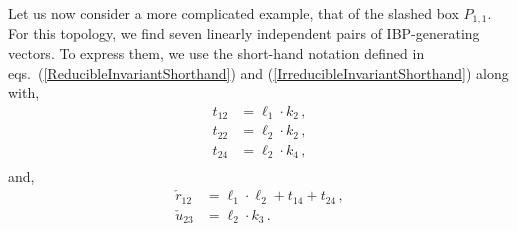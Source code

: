 \documentclass[aps,prd,preprint,groupedaddress,nofootinbib,showpacs,eqsecnum]{revtex4}
\def\eqns#1#2{eqs.~(\ref{#1}) and (\ref{#2})}
\def\Pn#1#2{P_{#1,#2}}
\begin{document}
\def\rs{\check{r}}
\def\us{\check{u}}
Let us now consider a more complicated example, that of the slashed
box $\Pn11$.  For this topology, we find seven linearly independent pairs
of IBP-generating vectors.  To express them, we use the
short-hand notation defined in
 \eqns{ReducibleInvariantShorthand}{IrreducibleInvariantShorthand} along with,
\begin{equation}
\begin{aligned}
t_{12} &= \ell_1\cdot k_2\,,\\
t_{22} &= \ell_2\cdot k_2\,,\\
t_{24} &= \ell_2\cdot k_4\,,\\
\end{aligned}
\label{SlashedBoxIrreducibleInvariantShorthand}
\end{equation}
and,
\begin{equation}
\begin{aligned}
\rs_{12} &= \ell_1\cdot\ell_2 + t_{14} + t_{24}\,,\\
\us_{23} &= \ell_2\cdot k_3\,.\\
\end{aligned}
\label{SlashedBoxReducibleInvariantShorthand}
\end{equation}
\end{document}
